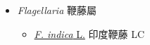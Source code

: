 
  \begin{itemize}
 \item[] \textit{Flagellaria} 鞭藤屬
                    
  \begin{itemize}
        \item[] \href{http://www.theplantlist.org/tpl1.1/search?q=Flagellaria+indica}{\textit{F. indica} L.}   印度鞭藤 LC
  \end{itemize}
  \end{itemize}
